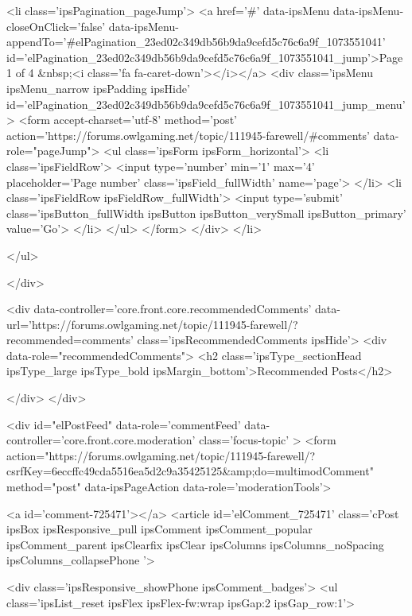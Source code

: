 			
				<li class='ipsPagination_pageJump'>
					<a href='#' data-ipsMenu data-ipsMenu-closeOnClick='false' data-ipsMenu-appendTo='#elPagination_23ed02c349db56b9da9cefd5c76c6a9f_1073551041' id='elPagination_23ed02c349db56b9da9cefd5c76c6a9f_1073551041_jump'>Page 1 of 4 &nbsp;<i class='fa fa-caret-down'></i></a>
					<div class='ipsMenu ipsMenu_narrow ipsPadding ipsHide' id='elPagination_23ed02c349db56b9da9cefd5c76c6a9f_1073551041_jump_menu'>
						<form accept-charset='utf-8' method='post' action='https://forums.owlgaming.net/topic/111945-farewell/#comments' data-role="pageJump">
							<ul class='ipsForm ipsForm_horizontal'>
								<li class='ipsFieldRow'>
									<input type='number' min='1' max='4' placeholder='Page number' class='ipsField_fullWidth' name='page'>
								</li>
								<li class='ipsFieldRow ipsFieldRow_fullWidth'>
									<input type='submit' class='ipsButton_fullWidth ipsButton ipsButton_verySmall ipsButton_primary' value='Go'>
								</li>
							</ul>
						</form>
					</div>
				</li>
			
		
	</ul>

					
				</div>
			
	

	

<div data-controller='core.front.core.recommendedComments' data-url='https://forums.owlgaming.net/topic/111945-farewell/?recommended=comments' class='ipsRecommendedComments ipsHide'>
	<div data-role="recommendedComments">
		<h2 class='ipsType_sectionHead ipsType_large ipsType_bold ipsMargin_bottom'>Recommended Posts</h2>
		
	</div>
</div>
	
	<div id="elPostFeed" data-role='commentFeed' data-controller='core.front.core.moderation' class='focus-topic' >
		<form action="https://forums.owlgaming.net/topic/111945-farewell/?csrfKey=6eccffc49cda5516ea5d2c9a35425125&amp;do=multimodComment" method="post" data-ipsPageAction data-role='moderationTools'>
			
			
				
					
					
					



<a id='comment-725471'></a>
<article  id='elComment_725471' class='cPost ipsBox ipsResponsive_pull  ipsComment ipsComment_popular ipsComment_parent ipsClearfix ipsClear ipsColumns ipsColumns_noSpacing ipsColumns_collapsePhone    '>
	

	
		<div class='ipsResponsive_showPhone ipsComment_badges'>
			<ul class='ipsList_reset ipsFlex ipsFlex-fw:wrap ipsGap:2 ipsGap_row:1'>
				
